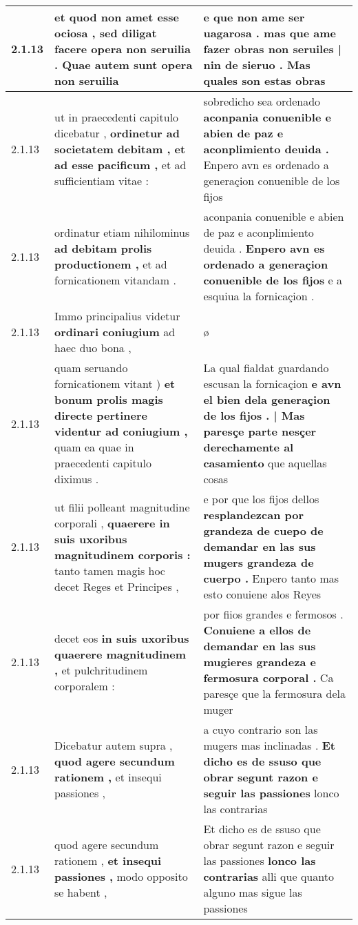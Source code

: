 \begin{tabular}{|p{1cm}|p{6.5cm}|p{6.5cm}|}
2.1.13 & et quod non amet esse ociosa , \textbf{ sed diligat facere opera non seruilia . } Quae autem sunt opera non seruilia & e que non ame ser uagarosa . \textbf{ mas que ame fazer obras non seruiles | nin de sieruo . } Mas quales son estas obras \\\hline
2.1.13 & ut in praecedenti capitulo dicebatur , \textbf{ ordinetur ad societatem debitam , et ad esse pacificum , } et ad sufficientiam vitae : & sobredicho sea ordenado \textbf{ aconpania conuenible e abien de paz e aconplimiento deuida . } Enpero avn es ordenado a generaçion conuenible de los fijos \\\hline
2.1.13 & ordinatur etiam nihilominus \textbf{ ad debitam prolis productionem , } et ad fornicationem vitandam . & aconpania conuenible e abien de paz e aconplimiento deuida . \textbf{ Enpero avn es ordenado a generaçion conuenible de los fijos } e a esquiua la fornicaçion . \\\hline
2.1.13 & Immo principalius videtur \textbf{ ordinari coniugium } ad haec duo bona , & ø \\\hline
2.1.13 & quam seruando fornicationem vitant ) \textbf{ et bonum prolis magis directe pertinere videntur ad coniugium , } quam ea quae in praecedenti capitulo diximus . & La qual fialdat guardando escusan la fornicaçion \textbf{ e avn el bien dela generaçion de los fijos . | Mas paresçe parte nesçer derechamente al casamiento } que aquellas cosas \\\hline
2.1.13 & ut filii polleant magnitudine corporali , \textbf{ quaerere in suis uxoribus magnitudinem corporis : } tanto tamen magis hoc decet Reges et Principes , & e por que los fijos dellos \textbf{ resplandezcan por grandeza de cuepo de demandar en las sus mugers grandeza de cuerpo . } Enpero tanto mas esto conuiene alos Reyes \\\hline
2.1.13 & decet eos \textbf{ in suis uxoribus quaerere magnitudinem , } et pulchritudinem corporalem : & por fiios grandes e fermosos . \textbf{ Conuiene a ellos de demandar en las sus mugieres grandeza e fermosura corporal . } Ca paresçe que la fermosura dela muger \\\hline
2.1.13 & Dicebatur autem supra , \textbf{ quod agere secundum rationem , } et insequi passiones , & a cuyo contrario son las mugers mas inclinadas . \textbf{ Et dicho es de ssuso que obrar segunt razon e seguir las passiones } lonco las contrarias \\\hline
2.1.13 & quod agere secundum rationem , \textbf{ et insequi passiones , } modo opposito se habent , & Et dicho es de ssuso que obrar segunt razon e seguir las passiones \textbf{ lonco las contrarias } alli que quanto alguno mas sigue las passiones \\\hline

\end{tabular}
